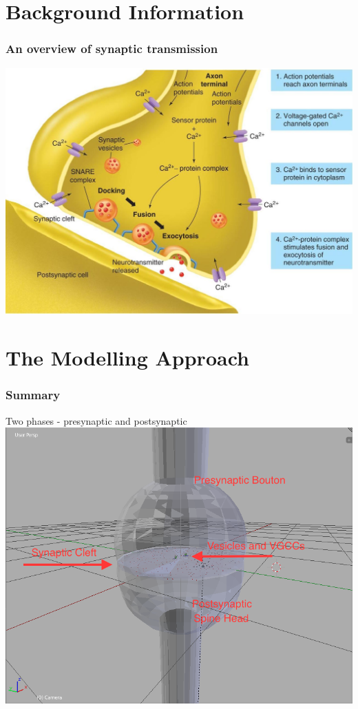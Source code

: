\documentclass{beamer}
\begin{document}
\section{Background Information}

\frame
{
    \frametitle{An overview of synaptic transmission}
    \includegraphics[width=1\textwidth]{fig1.jpg}
}


\section{The Modelling Approach}
\frame
{
    \frametitle{Summary}
    Two phases - presynaptic and postsynaptic
    \includegraphics[width=1\textwidth]{fig2.png}
}
\end{document}
